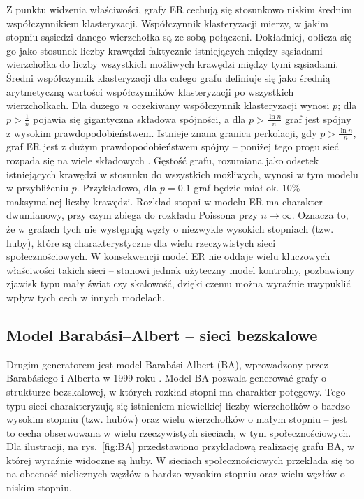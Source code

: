 Z punktu widzenia właściwości, grafy ER cechują się stosunkowo niskim średnim współczynnikiem klasteryzacji.
Współczynnik klasteryzacji mierzy, w jakim stopniu sąsiedzi danego wierzchołka są ze sobą połączeni.
Dokładniej, oblicza się go jako stosunek liczby krawędzi faktycznie istniejących między sąsiadami wierzchołka do liczby wszystkich możliwych krawędzi między tymi sąsiadami.
Średni współczynnik klasteryzacji dla całego grafu definiuje się jako średnią arytmetyczną wartości współczynników klasteryzacji po wszystkich wierzchołkach.
Dla dużego $n$ oczekiwany współczynnik klasteryzacji wynosi $p$; dla $p>\tfrac{1}{n}$ pojawia się gigantyczna składowa spójności, a dla $p>\tfrac{\ln n}{n}$ graf jest spójny z wysokim prawdopodobieństwem.
Istnieje znana granica perkolacji, gdy $p>\frac{\ln n}{n}$, graf ER jest z dużym prawdopodobieństwem spójny -- poniżej tego progu sieć rozpada się na wiele składowych \cite{ErdosRenyi1960}. Gęstość grafu, rozumiana jako odsetek istniejących krawędzi w stosunku do wszystkich możliwych, wynosi w tym modelu w przybliżeniu $p$. Przykładowo, dla $p=0.1$ graf będzie miał ok. 10\% maksymalnej liczby krawędzi. Rozkład stopni w modelu ER ma charakter dwumianowy, przy czym zbiega do rozkładu Poissona przy $n\to\infty$. Oznacza to, że w grafach tych nie występują węzły o niezwykle wysokich stopniach (tzw. huby), które są charakterystyczne dla wielu rzeczywistych sieci społecznościowych. W konsekwencji model ER nie oddaje wielu kluczowych właściwości takich sieci -- stanowi jednak użyteczny model kontrolny, pozbawiony zjawisk typu mały świat czy skalowość, dzięki czemu można wyraźnie uwypuklić wpływ tych cech w innych modelach.


\subsection{Model Barabási--Albert -- sieci bezskalowe}
Drugim generatorem jest model Barabási-Albert (BA), wprowadzony przez Barabásiego i Alberta w 1999 roku \cite{barabasi1999emergence}. Model BA pozwala generować grafy o strukturze bezskalowej, w których rozkład stopni ma charakter potęgowy. Tego typu sieci charakteryzują się istnieniem niewielkiej liczby wierzchołków o bardzo wysokim stopniu (tzw. hubów) oraz wielu wierzchołków o małym stopniu -- jest to cecha obserwowana w wielu rzeczywistych sieciach, w tym społecznościowych. Dla ilustracji, na rys.~\ref{fig:BA} przedstawiono przykładową realizację grafu BA, w której wyraźnie widoczne są huby. W sieciach społecznościowych przekłada się to na obecność nielicznych węzłów o bardzo wysokim stopniu oraz wielu węzłów o niskim stopniu.

